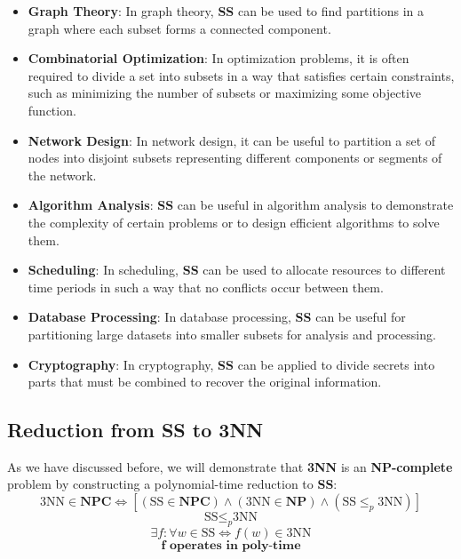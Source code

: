 \documentclass[../main]{subfiles}
\begin{document}
\begin{itemize}
    \item[\textbullet] \textbf{Graph Theory}: In graph theory, \textbf{SS} can be used to find partitions in a graph where each subset forms a connected component.
    \item[\textbullet] \textbf{Combinatorial Optimization}: In optimization problems, it is often required to divide a set into subsets in a way that satisfies certain constraints, such as minimizing the number of subsets or maximizing some objective function.
    \item[\textbullet] \textbf{Network Design}: In network design, it can be useful to partition a set of nodes into disjoint subsets representing different components or segments of the network.
    \item[\textbullet] \textbf{Algorithm Analysis}: \textbf{SS} can be useful in algorithm analysis to demonstrate the complexity of certain problems or to design efficient algorithms to solve them.
    \item[\textbullet] \textbf{Scheduling}: In scheduling, \textbf{SS} can be used to allocate resources to different time periods in such a way that no conflicts occur between them.
    \item[\textbullet] \textbf{Database Processing}: In database processing, \textbf{SS} can be useful for partitioning large datasets into smaller subsets for analysis and processing.
    \item[\textbullet] \textbf{Cryptography}: In cryptography, \textbf{SS} can be applied to divide secrets into parts that must be combined to recover the original information.
\end{itemize}

\subsection{Reduction from SS to 3NN}
As we have discussed before, we will demonstrate that \textbf{3NN} is an \textbf{NP-complete} problem by constructing a polynomial-time reduction to \textbf{SS}:
\begin{equation*}
\text{3NN} \in \textbf{NPC} \Longleftrightarrow
[(\text{SS} \in \textbf{NPC}) \land (\text{3NN} \in \textbf{NP}) \land (\text{SS} \leq_p \text{3NN})] 
\end{equation*}
\begin{equation*}
\text{SS} \leq_p \text{3NN} 
\end{equation*}
\begin{equation*}
\exists f : \forall w \in \text{SS} \Longleftrightarrow f(w) \in \text{3NN}
\end{equation*}
\begin{equation*}
\textbf{f operates in poly-time}
\end{equation*}
\end{document}

